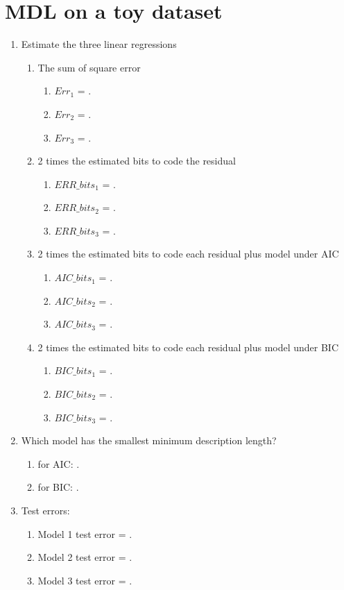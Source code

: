 \documentclass[english]{article}
\begin{document}
  \section{MDL on a toy dataset}
  \begin{enumerate}
    \item Estimate the three linear regressions
    \begin{enumerate}
      \item The sum of square error
      \begin{enumerate}
        \item $Err_1$ = .
        \item $Err_2$ = .
        \item $Err_3$ = .
      \end{enumerate}
      \item 2 times the estimated bits to code the residual
      \begin{enumerate}
        \item $ERR\_bits_1$ = .
        \item $ERR\_bits_2$ = .
        \item $ERR\_bits_3$ = .
      \end{enumerate}
      \item 2 times the estimated bits to code each residual plus model under AIC
      \begin{enumerate}
        \item $AIC\_bits_1$ = .
        \item $AIC\_bits_2$ = .
        \item $AIC\_bits_3$ = .
      \end{enumerate}
      \item 2 times the estimated bits to code each residual plus model under BIC
      \begin{enumerate}
        \item $BIC\_bits_1$ = .
        \item $BIC\_bits_2$ = .
        \item $BIC\_bits_3$ = .
      \end{enumerate}
    \end{enumerate}
    \item Which model has the smallest minimum description length?
    \begin{enumerate}
      \item for AIC: .
      \item for BIC: .
    \end{enumerate}
    \item Test errors:
    \begin{enumerate}
      \item Model 1 test error = .
      \item Model 2 test error = .
      \item Model 3 test error = .
    \end{enumerate}
  \end{enumerate}
\end{document}
